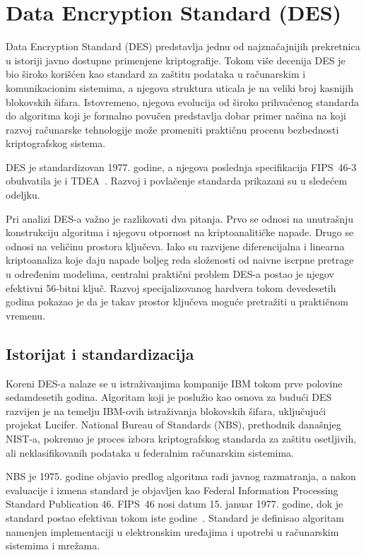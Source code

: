 \section{Data Encryption Standard (DES)}
\label{sec:des}

Data Encryption Standard (DES) predstavlja jednu od najznačajnijih
prekretnica u istoriji javno dostupne primenjene kriptografije. Tokom
više decenija DES je bio široko korišćen kao standard za zaštitu
podataka u računarskim i komunikacionim sistemima, a njegova struktura
uticala je na veliki broj kasnijih blokovskih šifara. Istovremeno,
njegova evolucija od široko prihvaćenog standarda do algoritma koji je
formalno povučen predstavlja dobar primer načina na koji razvoj
računarske tehnologije može promeniti praktičnu procenu bezbednosti
kriptografskog sistema.

DES je standardizovan 1977. godine, a njegova poslednja specifikacija
FIPS~46-3 obuhvatila je i TDEA~\cite{fips46-3}. Razvoj i povlačenje
standarda prikazani su u sledećem odeljku.

Pri analizi DES-a važno je razlikovati dva pitanja. Prvo se odnosi na
unutrašnju konstrukciju algoritma i njegovu otpornost na
kriptoanalitičke napade. Drugo se odnosi na veličinu prostora ključeva.
Iako su razvijene diferencijalna i linearna kriptoanaliza koje daju
napade boljeg reda složenosti od naivne iscrpne pretrage u određenim
modelima, centralni praktični problem DES-a postao je njegov efektivni
56-bitni ključ. Razvoj specijalizovanog hardvera tokom devedesetih
godina pokazao je da je takav prostor ključeva moguće pretražiti u
praktičnom vremenu.


\subsection{Istorijat i standardizacija}
\label{subsec:des_istorijat}

Koreni DES-a nalaze se u istraživanjima kompanije IBM tokom prve
polovine sedamdesetih godina. Algoritam koji je poslužio kao osnova za
budući DES razvijen je na temelju IBM-ovih istraživanja blokovskih
šifara, uključujući projekat Lucifer. National Bureau of Standards
(NBS), prethodnik današnjeg NIST-a, pokrenuo je proces izbora
kriptografskog standarda za zaštitu osetljivih, ali neklasifikovanih
podataka u federalnim računarskim sistemima.

NBS je 1975. godine objavio predlog algoritma radi javnog razmatranja,
a nakon evaluacije i izmena standard je objavljen kao Federal
Information Processing Standard Publication 46. FIPS~46 nosi datum
15. januar 1977. godine, dok je standard postao efektivan tokom iste
godine~\cite{fips46-1977,nist-des-history}. Standard je definisao
algoritam namenjen implementaciji u elektronskim uređajima i upotrebi
u računarskim sistemima i mrežama.

